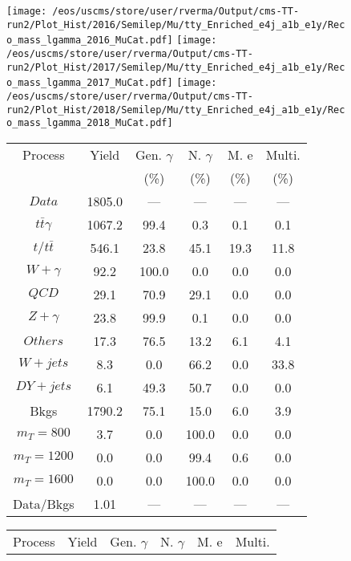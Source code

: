 \begin{figure}
\centering
\texttt{[image: /eos/uscms/store/user/rverma/Output/cms-TT-run2/Plot\_Hist/2016/Semilep/Mu/tty\_Enriched\_e4j\_a1b\_e1y/Reco\_mass\_lgamma\_2016\_MuCat.pdf]}
\texttt{[image: /eos/uscms/store/user/rverma/Output/cms-TT-run2/Plot\_Hist/2017/Semilep/Mu/tty\_Enriched\_e4j\_a1b\_e1y/Reco\_mass\_lgamma\_2017\_MuCat.pdf]}
\texttt{[image: /eos/uscms/store/user/rverma/Output/cms-TT-run2/Plot\_Hist/2018/Semilep/Mu/tty\_Enriched\_e4j\_a1b\_e1y/Reco\_mass\_lgamma\_2018\_MuCat.pdf]}
\begin{minipage}[c]{0.32\textwidth}
\centering
\tiny{
\begin{tabular}{cccccc}
\hline
Process & Yield & Gen. $\gamma$ & N. $\gamma$ & M. e & Multi. \\
 &  & (\%) & (\%) & (\%) & (\%)  \\
\hline
                                                                      $ Data $ &  1805.0 &  --- &  --- &  --- &  ---\\
$ t\bar{t}\gamma $ &  1067.2 &  99.4 &  0.3 &  0.1 &  0.1\\
$ t/t\bar{t} $ &  546.1 &  23.8 &  45.1 &  19.3 &  11.8\\
$ W+\gamma $ &  92.2 &  100.0 &  0.0 &  0.0 &  0.0\\
$ QCD $ &  29.1 &  70.9 &  29.1 &  0.0 &  0.0\\
$ Z+\gamma $ &  23.8 &  99.9 &  0.1 &  0.0 &  0.0\\
$ Others $ &  17.3 &  76.5 &  13.2 &  6.1 &  4.1\\
$ W+jets $ &  8.3 &  0.0 &  66.2 &  0.0 &  33.8\\
$ DY+jets $ &  6.1 &  49.3 &  50.7 &  0.0 &  0.0\\
Bkgs &  1790.2 &  75.1 &  15.0 &  6.0 &  3.9\\
$ m_{T} = 800 $ &  3.7 &  0.0 &  100.0 &  0.0 &  0.0\\
$ m_{T} = 1200 $ &  0.0 &  0.0 &  99.4 &  0.6 &  0.0\\
$ m_{T} = 1600 $ &  0.0 &  0.0 &  100.0 &  0.0 &  0.0\\
Data/Bkgs &  1.01 &  --- &  --- &  --- &  ---\\
\hline
\end{tabular}
}
\end{minipage}
\begin{minipage}[c]{0.32\textwidth}
\centering
\tiny{
\begin{tabular}{cccccc}
\hline
Process & Yield & Gen. $\gamma$ & N. $\gamma$ & M. e & Multi. \\

\end{tabular}}
\end{minipage}
\end{figure}
